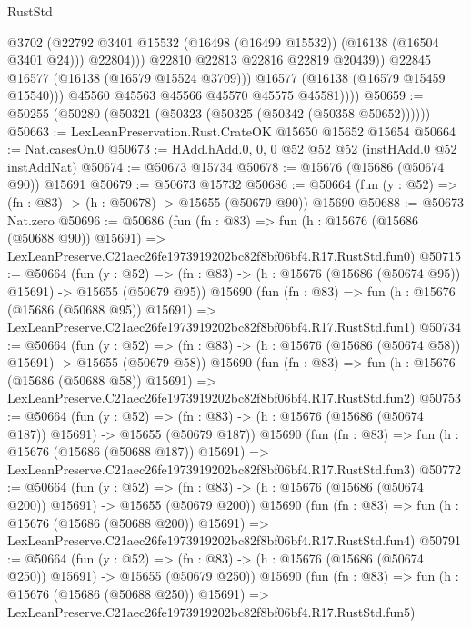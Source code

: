 \begin{lexlean}{RustStd}
\begin{coremodule}
                          @3702
                          (@22792 @3401 @15532 (@16498 (@16499 @15532)) (@16138 (@16504 @3401 @24)))
                          @22804)))
                    @22810
                    @22813
                    @22816
                    @22819
                    @20439))
                @22845
                @16577
                (@16138 (@16579 @15524 @3709)))
              @16577
              (@16138 (@16579 @15459 @15540)))
            @45560
            @45563
            @45566
            @45570
            @45575
            @45581))))
@50659 := @50255 (@50280 (@50321 (@50323 (@50325 (@50342 (@50358 @50652))))))
@50663 := LexLeanPreservation.Rust.CrateOK @15650 @15652 @15654
@50664 := Nat.casesOn.{0}
@50673 := HAdd.hAdd.{0, 0, 0} @52 @52 @52 (instHAdd.{0} @52 instAddNat)
@50674 := @50673 @15734
@50678 := @15676 (@15686 (@50674 @90)) @15691
@50679 := @50673 @15732
@50686 := @50664 (fun (y : @52) => (fn : @83) -> (h : @50678) -> @15655 (@50679 @90)) @15690
@50688 := @50673 Nat.zero
@50696 := @50686
    (fun (fn : @83) =>
    fun (h : @15676 (@15686 (@50688 @90)) @15691) =>
    LexLeanPreserve.C21aec26fe1973919202bc82f8bf06bf4.R17.RustStd.fun0)
@50715 := @50664
    (fun (y : @52) =>
    (fn : @83) -> (h : @15676 (@15686 (@50674 @95)) @15691) -> @15655 (@50679 @95))
    @15690
    (fun (fn : @83) =>
    fun (h : @15676 (@15686 (@50688 @95)) @15691) =>
    LexLeanPreserve.C21aec26fe1973919202bc82f8bf06bf4.R17.RustStd.fun1)
@50734 := @50664
    (fun (y : @52) =>
    (fn : @83) -> (h : @15676 (@15686 (@50674 @58)) @15691) -> @15655 (@50679 @58))
    @15690
    (fun (fn : @83) =>
    fun (h : @15676 (@15686 (@50688 @58)) @15691) =>
    LexLeanPreserve.C21aec26fe1973919202bc82f8bf06bf4.R17.RustStd.fun2)
@50753 := @50664
    (fun (y : @52) =>
    (fn : @83) -> (h : @15676 (@15686 (@50674 @187)) @15691) -> @15655 (@50679 @187))
    @15690
    (fun (fn : @83) =>
    fun (h : @15676 (@15686 (@50688 @187)) @15691) =>
    LexLeanPreserve.C21aec26fe1973919202bc82f8bf06bf4.R17.RustStd.fun3)
@50772 := @50664
    (fun (y : @52) =>
    (fn : @83) -> (h : @15676 (@15686 (@50674 @200)) @15691) -> @15655 (@50679 @200))
    @15690
    (fun (fn : @83) =>
    fun (h : @15676 (@15686 (@50688 @200)) @15691) =>
    LexLeanPreserve.C21aec26fe1973919202bc82f8bf06bf4.R17.RustStd.fun4)
@50791 := @50664
    (fun (y : @52) =>
    (fn : @83) -> (h : @15676 (@15686 (@50674 @250)) @15691) -> @15655 (@50679 @250))
    @15690
    (fun (fn : @83) =>
    fun (h : @15676 (@15686 (@50688 @250)) @15691) =>
    LexLeanPreserve.C21aec26fe1973919202bc82f8bf06bf4.R17.RustStd.fun5)

\end{coremodule}
\end{lexlean}
